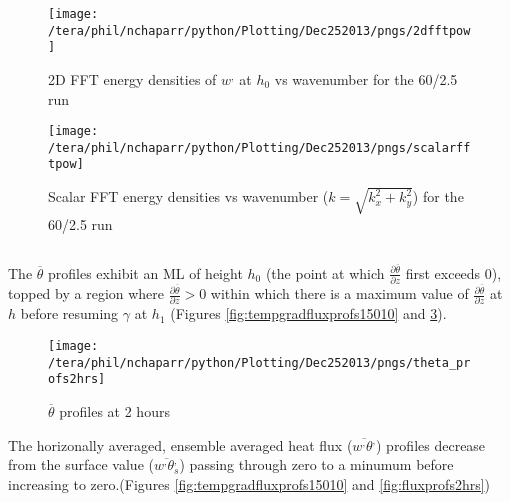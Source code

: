 \begin{figure}[htbp]
    \centering
    \texttt{[image: /tera/phil/nchaparr/python/Plotting/Dec252013/pngs/2dfftpow]}
    \caption{2D FFT energy densities of $w^{,}$ at $h_{0}$ vs wavenumber for the 60/2.5 run}
    \label{fig:scalardfftw602point5}   %
\end{figure}

\begin{figure}[htbp]
    \centering
    \texttt{[image: /tera/phil/nchaparr/python/Plotting/Dec252013/pngs/scalarfftpow]}
    \caption{Scalar FFT  energy densities vs wavenumber ($k = \sqrt{k_{x}^{2}+k_{y}^{2}}$) for the 60/2.5 run}
    \label{fig:2fftw602point5}   %
\end{figure}

\clearpage

\subsection{}%
\FloatBarrier

The $\overline{\theta}$ profiles exhibit an \acs{ML} of height $h_{0}$ (the point at which $\frac{\partial \overline{\theta}}{\partial z}$ first exceeds 0), 
topped by a region where $\frac{\partial\overline{\theta}}{\partial z}>0$ within which there is a maximum value of $\frac{\partial \overline{\theta}}{\partial z}$ 
at $h$ before resuming $\gamma$  at $h_{1}$ (Figures \ref{fig:tempgradfluxprofs15010} and \ref{fig:pottempprofs2hrs}).\\

\begin{figure}[htbp]
    \centering
    \texttt{[image: /tera/phil/nchaparr/python/Plotting/Dec252013/pngs/theta\_profs2hrs]}
    \caption{$\overline{\theta}$ profiles at 2 hours}
    \label{fig:pottempprofs2hrs}   %
\end{figure}


The horizonally averaged, ensemble averaged heat flux ($\overline{w^{,}\theta^{,}}$) profiles decrease from the surface value
($\overline{w^{,}\theta^{,}_{s}}$) passing through zero to a minumum before increasing to zero.(Figures \ref{fig:tempgradfluxprofs15010} and
 \ref{fig:fluxprofs2hrs})\\

